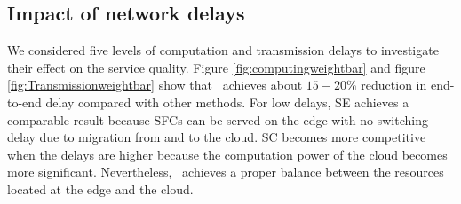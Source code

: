 










\subsection{Impact of network delays}
We considered five levels of computation and transmission delays to investigate their effect on the service quality. 
Figure \ref{fig:computingweightbar} and figure \ref{fig:Transmissionweightbar} show that \myalgorithm\ achieves about $15-20\%$ reduction in end-to-end delay compared with other methods. 
For low delays, SE achieves a comparable result because SFCs can be served on the edge with no switching delay due to migration from and to the cloud. SC becomes more competitive when the delays are higher because the computation power of the cloud becomes more significant. Nevertheless, \myalgorithm\ achieves a proper balance between the resources located at the edge and the cloud.



